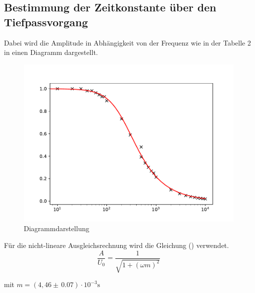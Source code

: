 \subsection{Bestimmung der Zeitkonstante über den Tiefpassvorgang}
Dabei wird die Amplitude in Abhängigkeit von der Frequenz wie in der Tabelle 2 in
einen Diagramm dargestellt.

\begin{figure}[H]
  \centering
  \includegraphics[width=\textwidth]{Diagramm2.pdf}
  \caption{Diagrammdarstellung}
  \label{fig:2}
\end{figure}
Für die nicht-lineare Ausgleichsrechnung wird die Gleichung () verwendet.
\begin{equation*}
  \frac{A}{U_0} = \frac{1}{\sqrt{1 + (\omega m)^2}}
\end{equation*}
\centerline{mit $m = (4,46 \pm \, 0.07) \cdot 10^{-3} \si{\second}$}
